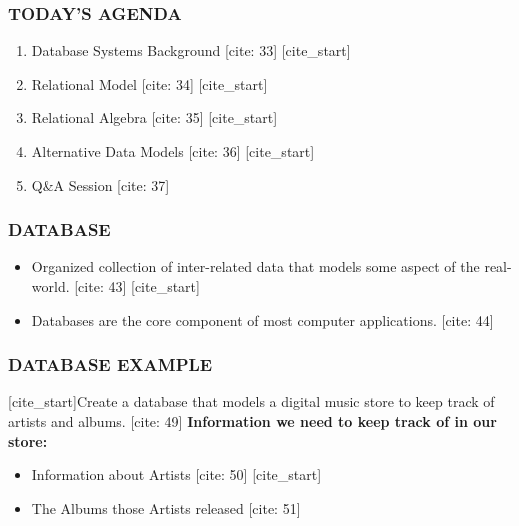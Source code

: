 \documentclass[aspectratio=169]{beamer}
\begin{document}
\begin{frame}
    \frametitle{TODAY'S AGENDA}
    \begin{enumerate}
        \item Database Systems Background [cite: 33]
        [cite_start]\item Relational Model [cite: 34]
        [cite_start]\item Relational Algebra [cite: 35]
        [cite_start]\item Alternative Data Models [cite: 36]
        [cite_start]\item Q\&A Session [cite: 37]
    \end{enumerate}
\end{frame}

\begin{frame}
    \frametitle{DATABASE}
    \begin{itemize}
        [cite_start]\item Organized collection of inter-related data that models some aspect of the real-world. [cite: 43]
        [cite_start]\item Databases are the core component of most computer applications. [cite: 44]
    \end{itemize}
\end{frame}

\begin{frame}
    \frametitle{DATABASE EXAMPLE}
    [cite_start]Create a database that models a digital music store to keep track of artists and albums. [cite: 49]
    \vspace{1em}
    \textbf{Information we need to keep track of in our store:}
    \begin{itemize}
        [cite_start]\item Information about Artists [cite: 50]
        [cite_start]\item The Albums those Artists released [cite: 51]
    \end{itemize}
\end{frame}
\end{document}
